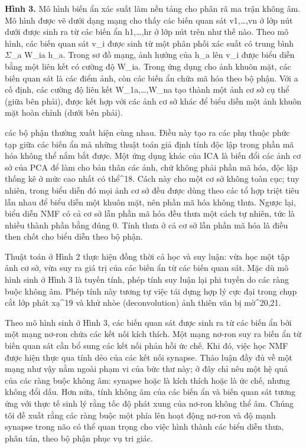 \textbf{Hình 3.} Mô hình biến ẩn xác suất làm nền tảng cho phân rã ma trận không âm. Mô hình được vẽ dưới dạng mạng cho thấy các biến quan sát v1,\ldots,vn ở lớp nút dưới được sinh ra từ các biến ẩn h1,\ldots,hr ở lớp nút trên như thế nào. Theo mô hình, các biến quan sát v\_i được sinh từ một phân phối xác suất có trung bình \ensuremath{\Sigma}\_a W\_ia h\_a. Trong sơ đồ mạng, ảnh hưởng của h\_a lên v\_i được biểu diễn bằng một liên kết có cường độ W\_ia. Trong ứng dụng cho ảnh khuôn mặt, các biến quan sát là các điểm ảnh, còn các biến ẩn chứa mã hóa theo bộ phận. Với a cố định, các cường độ liên kết W\_1a,\ldots,W\_na tạo thành một ảnh cơ sở cụ thể (giữa bên phải), được kết hợp với các ảnh cơ sở khác để biểu diễn một ảnh khuôn mặt hoàn chỉnh (dưới bên phải).

các bộ phận thường xuất hiện cùng nhau. Điều này tạo ra các phụ thuộc phức tạp giữa các biến ẩn mà những thuật toán giả định tính độc lập trong phần mã hóa không thể nắm bắt được. Một ứng dụng khác của ICA là biến đổi các ảnh cơ sở của PCA để làm cho bản thân các ảnh, chứ không phải phần mã hóa, độc lập thống kê ở mức cao nhất có thể\^{}18. Cách này cho một cơ sở không toàn cục; tuy nhiên, trong biểu diễn đó mọi ảnh cơ sở đều được dùng theo các tổ hợp triệt tiêu lẫn nhau để biểu diễn một khuôn mặt, nên phần mã hóa không thưa. Ngược lại, biểu diễn NMF có cả cơ sở lẫn phần mã hóa đều thưa một cách tự nhiên, tức là nhiều thành phần bằng đúng 0. Tính thưa ở cả cơ sở lẫn phần mã hóa là điều then chốt cho biểu diễn theo bộ phận.

Thuật toán ở Hình 2 thực hiện đồng thời cả học và suy luận: vừa học một tập ảnh cơ sở, vừa suy ra giá trị của các biến ẩn từ các biến quan sát. Mặc dù mô hình sinh ở Hình 3 là tuyến tính, phép tính suy luận lại phi tuyến do các ràng buộc không âm. Phép tính này tương tự việc tái dựng hợp lý cực đại trong chụp cắt lớp phát xạ\^{}19 và khử nhòe (deconvolution) ảnh thiên văn bị mờ\^{}20,21.

Theo mô hình sinh ở Hình 3, các biến quan sát được sinh ra từ các biến ẩn bởi một mạng nơ-ron chứa các kết nối kích thích. Một mạng nơ-ron suy ra biến ẩn từ biến quan sát cần bổ sung các kết nối phản hồi ức chế. Khi đó, việc học NMF được hiện thực qua tính dẻo của các kết nối synapse. Thảo luận đầy đủ về một mạng như vậy nằm ngoài phạm vi của bức thư này; ở đây chỉ nêu một hệ quả của các ràng buộc không âm: synapse hoặc là kích thích hoặc là ức chế, nhưng không đổi dấu. Hơn nữa, tính không âm của các biến ẩn và biến quan sát tương ứng với thực tế sinh lý rằng tốc độ phát xung của nơ-ron không thể âm. Chúng tôi đề xuất rằng các ràng buộc một phía lên hoạt động nơ-ron và độ mạnh synapse trong não có thể quan trọng cho việc hình thành các biểu diễn thưa, phân tán, theo bộ phận phục vụ tri giác.

